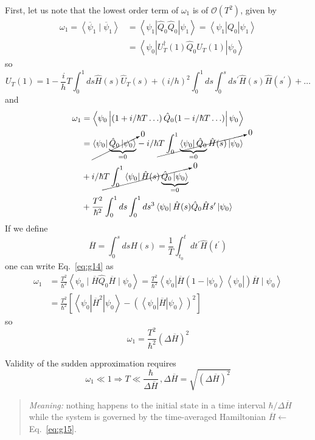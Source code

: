 \documentclass[12pt]{article}
\newcommand{\be}{\begin{equation}}
\newcommand{\ee}{\end{equation}}
\begin{document}
First, let us note that the lowest order term of $\omega_{1}$
is of $\mathcal{O}\left(T^{2}\right)$, given by
\[
\begin{aligned} 
\omega_{1}=\left\langle\overline{\psi}_{1} \mid \overline{\psi}_{1}\right\rangle 
&=\left\langle\psi_{1}\left|\hat{Q}_{0} \hat{Q}_{0}\right| \psi_{1}\right\rangle=\left\langle\psi_{1}\left|Q_{0}\right| \psi_{1}\right\rangle \\
&=\left\langle\psi_{0}\left|U_{T}^{\dagger}(1) \hat{Q}_{0} U_{T}(1)\right| \psi_{0}\right\rangle
\end{aligned}
\]
so
\[
U_{T}(1)=1-\frac{i}{h} T \int_{0}^{1} d s \hat{H}(s) \hat{U}_{T}(s)+(i / h)^{2} \int_{0}^{1} d s \int_{0}^{s} d s^{\prime} \hat{H}(s) \hat{H}\left(s^{\prime}\right)+\ldots
\]
and
\be
\begin{aligned}
\omega_{1}
&=\left\langle\psi_{0}\left|\left(1+i / \hbar T \ldots\right) \hat{Q}_{0}(1-i / \hbar T \ldots)\right| \psi_{0}\right\rangle\\
&= \cancelto{0}{\bra{\psi_0}\underbrace{\hat{Q}_{0}\ket{\psi_0}}_{=0}}
-i/\hbar \cancelto{0}{T \int_0^1 \underbrace{\bra{\psi_0}\hat{Q}_{0}}_{=0}\hat{H}(s)\ket{\psi_0}}\\
&+i/\hbar \cancelto{0}{T \int_0^1 \bra{\psi_0}\hat{H}(s)\underbrace{\hat{Q}_{0}\ket{\psi_0}}_{=0}}\\
&+\frac{T^{2}}{\hbar^{2}} \int_{0}^{1} d s \int_{0}^{1} d s^{3}\bra{\psi_{0}}\hat{H}(s) \hat{Q}_{0} \hat{H}s^{\prime}\ket{\psi_{0}}
\label{eq:g14}
\end{aligned}
\ee
If we define
\be
\overline{H}=\int_{0}^{s} d s H(s)=\frac{1}{T} \int_{t_{0}}^{t} d t^{\prime} \hat{H}\left(t^{\prime}\right)
\label{eq:g15}
\ee
one can write Eq.~\eqref{eq:g14} as
\[
\begin{aligned} 
\omega_{1} 
&=\frac{T^{2}}{\hbar^{2}}\left\langle\psi_{0} \mid \overline{H} \hat{Q}_{0} \overline{H} \mid \psi_{0}\right\rangle
=\frac{T^{2}}{\hbar^{2}}\left\langle\psi_{0}\left|\overline{H}\left(1-| \psi_{0}\right\rangle\left\langle\psi_{0}\right|\right) \overline{H} \mid \psi_{0}\right\rangle \\ 
&=\frac{T^{2}}{\hbar^{2}}\left[\left\langle\psi_{0}\left|\overline{H}^{2}\right| \psi_{0}\right\rangle-\left(\left\langle\psi_{0}|\overline{H}| \psi_{0}\right\rangle\right)^{2}\right] 
\end{aligned}
\]
so
\be
\omega_1 = \frac{T^2}{\hbar^2} \left(\Delta\overline{H}\right)^2
\ee


Validity of the sudden approximation requires
\be
\omega_1 \ll 1 \Rightarrow \boxed{T \ll \frac{\hbar}{\Delta\overline{H}}}\,, 
\Delta\overline{H} = \sqrt{(\Delta\overline{H})^2}
\ee
\begin{quote}
\emph{Meaning:} nothing happens to the initial state
in a time interval $\hbar/ \Delta \overline{H}$ while the
system is governed by the time-averaged
Hamiltonian $\overline{H} \leftarrow$ Eq.~\eqref{eq:g15}.
\end{quote}
\end{document}
